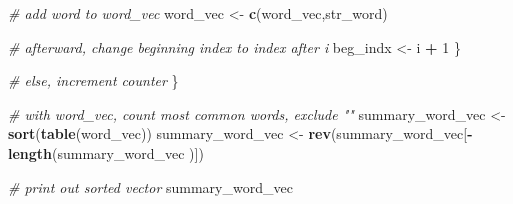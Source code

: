 \documentclass[
]{article}
\newenvironment{Shaded}{\begin{snugshade}}{\end{snugshade}}
\newcommand{\CommentTok}[1]{\textcolor[rgb]{0.56,0.35,0.01}{\textit{#1}}}
\newcommand{\DecValTok}[1]{\textcolor[rgb]{0.00,0.00,0.81}{#1}}
\newcommand{\FunctionTok}[1]{\textcolor[rgb]{0.13,0.29,0.53}{\textbf{#1}}}
\newcommand{\NormalTok}[1]{#1}
\newcommand{\OtherTok}[1]{\textcolor[rgb]{0.56,0.35,0.01}{#1}}
\newcommand{\SpecialCharTok}[1]{\textcolor[rgb]{0.81,0.36,0.00}{\textbf{#1}}}
\begin{document}
\begin{Shaded}
\begin{Highlighting}[]
    \CommentTok{\# add word to word\_vec}
\NormalTok{    word\_vec }\OtherTok{\textless{}{-}} \FunctionTok{c}\NormalTok{(word\_vec,str\_word)}
    
    \CommentTok{\# afterward, change beginning index to index after i}
\NormalTok{    beg\_indx }\OtherTok{\textless{}{-}}\NormalTok{ i }\SpecialCharTok{+} \DecValTok{1}
\NormalTok{  \}}
  
  \CommentTok{\# else, increment counter}
\NormalTok{\}}

\CommentTok{\# with word\_vec, count most common words, exclude ""}
\NormalTok{summary\_word\_vec }\OtherTok{\textless{}{-}} \FunctionTok{sort}\NormalTok{(}\FunctionTok{table}\NormalTok{(word\_vec))}
\NormalTok{summary\_word\_vec }\OtherTok{\textless{}{-}} \FunctionTok{rev}\NormalTok{(summary\_word\_vec[}\SpecialCharTok{{-}}\FunctionTok{length}\NormalTok{(summary\_word\_vec )])}

\CommentTok{\# print out sorted vector}
\NormalTok{summary\_word\_vec}
\end{Highlighting}
\end{Shaded}
\end{document}
